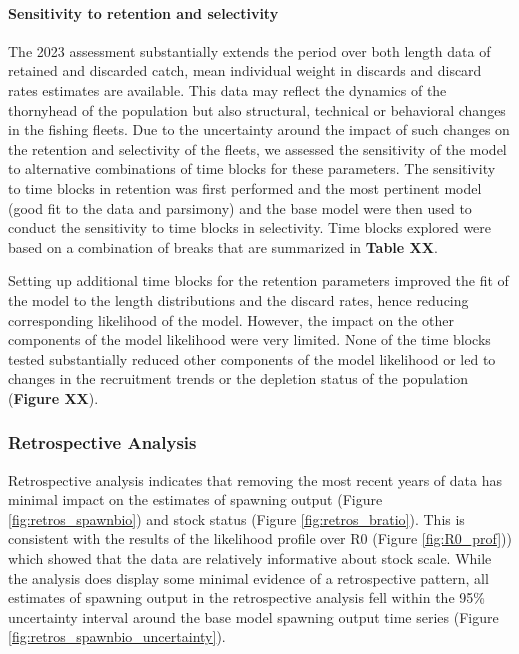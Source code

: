 \documentclass[11pt,
  english,
  letterpaper,
]{article}
\begin{document}
\hypertarget{sensitivity-to-retention-and-selectivity}{%
\paragraph{Sensitivity to retention and selectivity}\label{sensitivity-to-retention-and-selectivity}}

The 2023 assessment substantially extends the period over both length data of retained and discarded catch, mean individual weight in discards and discard rates estimates are available. This data may reflect the dynamics of the thornyhead of the population but also structural, technical or behavioral changes in the fishing fleets. Due to the uncertainty around the impact of such changes on the retention and selectivity of the fleets, we assessed the sensitivity of the model to alternative combinations of time blocks for these parameters. The sensitivity to time blocks in retention was first performed and the most pertinent model (good fit to the data and parsimony) and the base model were then used to conduct the sensitivity to time blocks in selectivity. Time blocks explored were based on a combination of breaks that are summarized in \textbf{Table XX}.

Setting up additional time blocks for the retention parameters improved the fit of the model to the length distributions and the discard rates, hence reducing corresponding likelihood of the model. However, the impact on the other components of the model likelihood were very limited. None of the time blocks tested substantially reduced other components of the model likelihood or led to changes in the recruitment trends or the depletion status of the population (\textbf{Figure XX}).

\hypertarget{retrospective-analysis}{%
\subsubsection{Retrospective Analysis}\label{retrospective-analysis}}

Retrospective analysis indicates that removing the most recent years of data has minimal impact on the estimates of spawning output (Figure \ref{fig:retros_spawnbio}) and stock status (Figure \ref{fig:retros_bratio}). This is consistent with the results of the likelihood profile over R0 (Figure \ref{fig:R0_prof})) which showed that the data are relatively informative about stock scale. While the analysis does display some minimal evidence of a retrospective pattern, all estimates of spawning output in the retrospective analysis fell within the 95\% uncertainty interval around the base model spawning output time series (Figure \ref{fig:retros_spawnbio_uncertainty}).
\end{document}
